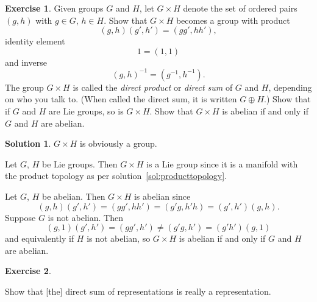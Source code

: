 \documentclass[11pt, a4paper]{report}
\theoremstyle{definition}
\newtheorem{exercise}{Exercise}[part]
\newtheorem{solution}{Solution}[part]
\newenvironment{ex}{\begin{exercise}}{\end{exercise}\pagebreak[1]}
\newenvironment{sol}{\begin{solution}}{\end{solution}\pagebreak[3]}
\begin{document}
\begin{ex}

Given groups $G$ and $H$, let $G \times H$ denote the set of ordered pairs $(g, h)$ with $g \in G$, $h \in H$.
Show that $G \times H$ becomes a group with product
\[
    (g, h) (g', h') = (gg', hh'),
\]
identity element
\[
    1 = (1, 1)
\]
and inverse
\[
    {(g, h)}^{-1} = (g^{-1}, h^{-1}).
\]
The group $G \times H$ is called the \emph{direct product} or \emph{direct sum} of $G$ and $H$, depending on who you talk to.
(When called the direct sum, it is written $G \oplus H$.)
Show that if $G$ and $H$ are Lie groups, so is $G \times H$.
Show that $G \times H$ is abelian if and only if $G$ and $H$ are abelian.

\end{ex}

\begin{sol}

$G \times H$ is obviously a group.

Let $G$, $H$ be Lie groups.
Then $G \times H$ is a Lie group since it is a manifold with the product topology as per solution~\ref{sol:producttopology}.

Let $G$, $H$ be abelian. Then $G \times H$ is abelian since
\[
    (g, h) (g', h') = (gg', hh') = (g'g, h'h) = (g', h')(g, h).
\]
Suppose $G$ is not abelian. Then
\[
    (g, 1) (g', h') = (gg', h') \neq (g'g, h') = (g' h')(g, 1)
\]
and equivalently if $H$ is not abelian, so $G \times H$ is abelian if and only if $G$ and $H$ are abelian.

\end{sol}

\begin{ex}\label{ex:directsumrepresentation}

Show that [the] direct sum of representations is really a representation.

\end{ex}
\end{document}
